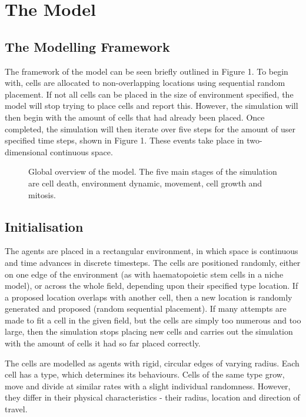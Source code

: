 \documentclass[11.5pt]{article}
\begin{document}
\section{The Model}
\subsection{The Modelling Framework}

The framework of the model can be seen briefly outlined in Figure 1. To 
begin with, cells are allocated to non-overlapping locations using 
sequential random placement. If not all cells can be placed in the size 
of environment specified, the model will stop trying to place cells and 
report this. However, the simulation will then begin with the amount of 
cells that had already been placed. Once completed, the simulation will 
then iterate over five steps for the amount of user specified time 
steps, shown in Figure 1. These events take place in two-dimensional 
continuous space. 

\begin{figure}[H]
\centering
\caption{Global overview of the model. The five main stages 
of the simulation are cell death, environment dynamic, movement, cell 
growth and mitosis.}
\end{figure}

\subsection{Initialisation}
The agents are placed in a rectangular environment, in which space is 
continuous and time advances in discrete timesteps. The cells are 
positioned randomly, either on one edge of the environment (as with 
haematopoietic stem cells in a niche model), or across the whole field, 
depending upon their specified type location. If a proposed location 
overlaps with another cell, then a new location is randomly generated 
and proposed (random sequential placement). If many attempts are made to 
fit a cell in the given field, but the cells are simply too numerous and 
too large, then the simulation stops placing new cells and carries out 
the simulation with the amount of cells it had so far placed correctly.

The cells are modelled as agents with rigid, circular edges of varying 
radius. Each cell has a type, which determines its behaviours. Cells of 
the same type grow, move and divide at similar rates with a slight 
individual randomness. However, they differ in their physical 
characteristics - their radius, location and direction of travel.
\end{document}
